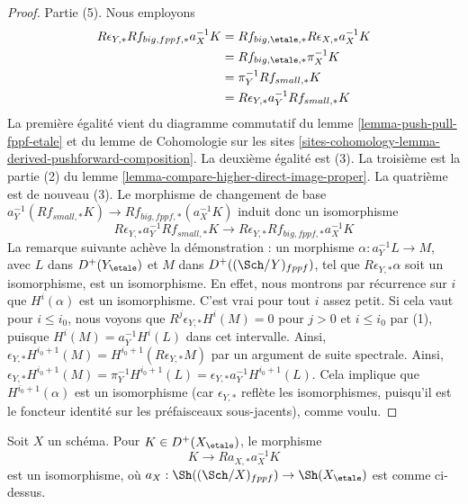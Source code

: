 \begin{proof}
\medskip\noindent
Partie (5). Nous employons
\begin{align*}
R\epsilon_{Y, *}Rf_{big, fppf, *}a_X^{-1}K
& =
Rf_{big, \etale, *}R\epsilon_{X, *}a_X^{-1}K \\
& =
Rf_{big, \etale, *}\pi_X^{-1}K \\
& =
\pi_Y^{-1}Rf_{small, *}K \\
& =
R\epsilon_{Y, *} a_Y^{-1}Rf_{small, *}K
\end{align*}
La première égalité vient du diagramme commutatif du
lemme \ref{lemma-push-pull-fppf-etale}
et du lemme de Cohomologie sur les sites
\ref{sites-cohomology-lemma-derived-pushforward-composition}.
La deuxième égalité est (3). La troisième est la partie (2) du
lemme \ref{lemma-compare-higher-direct-image-proper}.
La quatrième est de nouveau (3). Le morphisme de changement de base
$a_Y^{-1}(Rf_{small, *}K) \to Rf_{big, fppf, *}(a_X^{-1}K)$
induit donc un isomorphisme
$$
R\epsilon_{Y, *}a_Y^{-1}Rf_{small, *}K \to
R\epsilon_{Y, *}Rf_{big, fppf, *}a_X^{-1}K
$$
La remarque suivante achève la démonstration : un morphisme
$\alpha : a_Y^{-1}L \to M$, avec $L$ dans $D^+(Y_\etale)$
et $M$ dans $D^+((\Sch/Y)_{fppf})$, tel que $R\epsilon_{Y, *}\alpha$
soit un isomorphisme, est un isomorphisme. En effet,
nous montrons par récurrence sur $i$ que $H^i(\alpha)$ est un isomorphisme.
C'est vrai pour tout $i$ assez petit.
Si cela vaut pour $i \leq i_0$, nous voyons que
$R^j\epsilon_{Y, *}H^i(M) = 0$ pour $j > 0$ et $i \leq i_0$
par (1), puisque $H^i(M) = a_Y^{-1}H^i(L)$ dans cet intervalle.
Ainsi, $\epsilon_{Y, *}H^{i_0 + 1}(M) = H^{i_0 + 1}(R\epsilon_{Y, *}M)$
par un argument de suite spectrale.
Ainsi, $\epsilon_{Y, *}H^{i_0 + 1}(M) = \pi_Y^{-1}H^{i_0 + 1}(L) =
\epsilon_{Y, *}a_Y^{-1}H^{i_0 + 1}(L)$.
Cela implique que $H^{i_0 + 1}(\alpha)$ est un isomorphisme
(car $\epsilon_{Y, *}$ reflète les isomorphismes, puisqu'il est le
foncteur identité sur les préfaisceaux sous-jacents), comme voulu.
\end{proof}

\begin{lemma}
\label{lemma-cohomological-descent-etale-fppf}
Soit $X$ un schéma. Pour $K \in D^+(X_\etale)$, le morphisme
$$
K \longrightarrow Ra_{X, *}a_X^{-1}K
$$
est un isomorphisme, où $a_X : \Sh((\Sch/X)_{fppf}) \to \Sh(X_\etale)$
est comme ci-dessus.
\end{lemma}

